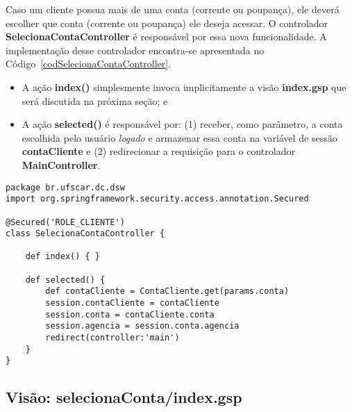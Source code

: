 \vspace{0.2cm}

Caso um  cliente possua  mais de  uma conta (corrente  ou poupança),  ele deverá
escolher que  conta (corrente  ou poupança) ele  deseja acessar.   O controlador
{\bf SelecionaContaController}  é responsável  por essa nova  funcionalidade.  A
implementação      desse     controlador     encontra-se      apresentada     no
Código~\ref{codSelecionaContaController}.  

\vspace{0.2cm}

\begin{itemize}

\item  A ação  {\bf index()}  simplesmente  invoca implicitamente  a visão  {\bf
  index.gsp} que será discutida na próxima seção; e

\vspace{0.2cm}

\item A ação {\bf selected()} é  responsável por: (1) receber, como parâmetro, a
  conta escolhida pelo  usuário {\it logado} e armazenar  essa conta na variável
  de  sessão  {\bf  contaCliente}  e   (2)  redirecionar  a  requisição  para  o
  controlador {\bf MainController}. 

\end{itemize}

\begin{lstlisting}[caption=Controlador      {\bf      SelecionaContaController},
    frame=trBL, float=htbp, label=codSelecionaContaController] 
package br.ufscar.dc.dsw 
import org.springframework.security.access.annotation.Secured

@Secured('ROLE_CLIENTE')
class SelecionaContaController {

    def index() { }
    
    def selected() {
        def contaCliente = ContaCliente.get(params.conta)
        session.contaCliente = contaCliente
        session.conta = contaCliente.conta
        session.agencia = session.conta.agencia
        redirect(controller:'main')        
    }
}
\end{lstlisting}

\subsection{Visão: selecionaConta/index.gsp}

\vspace{0.5cm}

